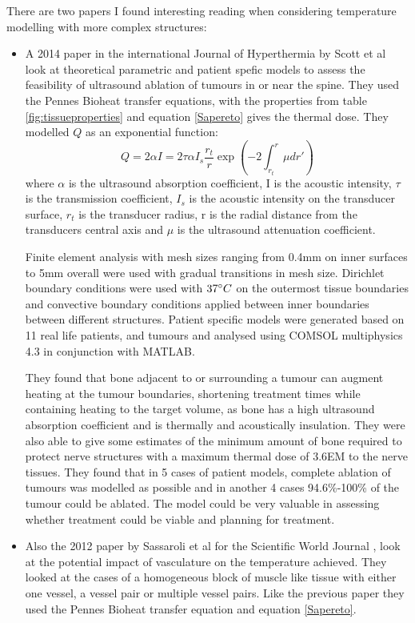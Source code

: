 \documentclass[11pt]{article} %
\begin{document}
There are two papers I found interesting reading when considering temperature modelling with more complex structures:
\begin{itemize}
	\item A 2014 paper in the international Journal of Hyperthermia by Scott et al \cite{Scott2014} look at theoretical parametric and patient spefic models to assess the feasibility of ultrasound ablation of tumours in or near the spine. They used the Pennes Bioheat transfer equations, with the properties from table \ref{fig:tissueproperties} and equation \ref{Sapereto} gives the thermal dose. They modelled $ Q $ as an exponential function:
	\begin{equation}
	Q=2\alpha I=2\tau \alpha I_s\frac{r_t}{r}\exp\left( -2\int_{r_t}^r \mu dr' \right) \label{ComplicatedQ}
	\end{equation}
	where $ \alpha $ is the ultrasound absorption coefficient, I is the acoustic intensity, $ \tau $ is the transmission coefficient, $ I_s $ is the acoustic intensity on the transducer surface, $ r_t $ is the transducer radius, r is the radial distance from the transducers central axis and $ \mu $ is the ultrasound attenuation coefficient.
	
	Finite element analysis with mesh sizes ranging from 0.4mm on inner surfaces to 5mm overall were used with gradual transitions in mesh size. Dirichlet boundary conditions were used with $ 37\degree C $ on the outermost tissue boundaries and convective boundary conditions applied between inner boundaries between different structures. Patient specific models were generated based on 11 real life patients, and tumours and analysed using COMSOL multiphysics 4.3 in conjunction with MATLAB. 
	
	They found that bone adjacent to or surrounding a tumour can augment heating at the tumour boundaries, shortening treatment times while containing heating to the target volume, as bone has a high ultrasound absorption coefficient and is thermally and acoustically insulation. They were also able to give some estimates of the minimum amount of bone required to protect nerve structures with a maximum thermal dose of  3.6EM to the nerve tissues. They found that in 5 cases of patient models, complete ablation of tumours was modelled as possible and in another 4 cases 94.6\%-100\% of the tumour could be ablated. The model could be very valuable in assessing whether treatment could be viable and planning for treatment. 
	\item Also the 2012 paper by Sassaroli et al for the Scientific World Journal \cite{Sassaroli2012},  look at the potential impact of vasculature on the temperature achieved. They looked at the cases of a homogeneous block of muscle like tissue with either one vessel, a vessel pair or multiple vessel pairs. Like the previous paper they used the Pennes Bioheat transfer equation and equation \ref{Sapereto}. 
	

\end{itemize}
\end{document}
